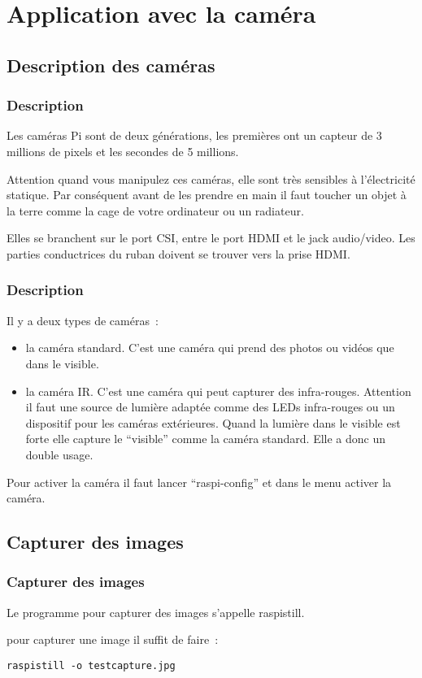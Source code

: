 \section{Application avec la caméra}

\subsection{Description des caméras}

\begin{frame}[containsverbatim]
\frametitle{Description}
Les caméras Pi sont de deux générations, les premières ont un capteur de 3 millions de pixels et les secondes de 5 millions.

Attention quand vous manipulez ces caméras, elle sont très sensibles à l'électricité statique. Par conséquent avant de les prendre en main il faut toucher un objet à la terre comme la cage de votre ordinateur ou un radiateur.

Elles se branchent sur le port CSI, entre le port HDMI et le jack audio/video. Les parties conductrices du ruban doivent se trouver vers la prise HDMI.

\end{frame}

\begin{frame}[containsverbatim]
\frametitle{Description}

Il y a deux types de caméras~:
\begin{itemize}
	\item la caméra standard. C'est une caméra qui prend des photos ou vidéos que dans le visible.
	\item la caméra IR. C'est une caméra qui peut capturer des infra-rouges. Attention il faut une source de lumière adaptée comme des LEDs infra-rouges ou un dispositif pour les caméras extérieures. Quand la lumière dans le visible est forte elle capture le ``visible'' comme la caméra standard. Elle a donc un double usage.
\end{itemize}

Pour activer la caméra il faut lancer ``raspi-config'' et dans le menu activer la caméra.

\end{frame}

\subsection{Capturer des images}

\begin{frame}[containsverbatim]
\frametitle{Capturer des images}

Le programme pour capturer des images s'appelle raspistill. 

pour capturer une image il suffit de faire~:

\begin{verbatim}
raspistill -o testcapture.jpg
\end{verbatim}

\end{frame}

